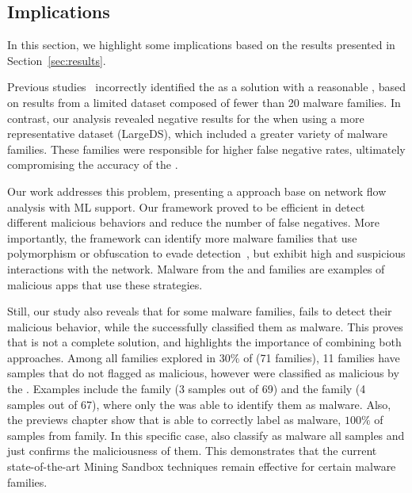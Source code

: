 \subsection{Implications}\label{sec:implications}

In this section, we highlight some implications based on the results presented in Section~\ref{sec:results}.\newline

Previous studies~\cite{DBLP:conf/wcre/BaoLL18,DBLP:conf/iceccs/LeB0GL18,DBLP:journals/jss/CostaMMSSBNR22} incorrectly identified the \mas as a solution with a reasonable \fone, based on results from a limited dataset composed of fewer than 20 malware families. In contrast, our analysis revealed negative results for the \mas when using a more representative dataset (LargeDS), which included a greater variety of malware families. These families were responsible for higher false negative rates, ultimately compromising the accuracy of the \mas.

Our work addresses this problem, presenting a approach base on network flow analysis with ML support. Our framework proved to be efficient in detect different malicious behaviors and reduce the number of false negatives. More importantly, the framework can identify more malware families that use polymorphism or obfuscation to evade detection~\cite{DBLP:conf/acsac/MoserKK07}, but exhibit high and suspicious interactions with the network. Malware from the \gps and \dwg families are examples of malicious apps that use these strategies.

Still, our study also reveals that for some malware families, \droidxpflow fails to detect their malicious behavior, while the \mas successfully classified them as malware. This proves that \net is not a complete solution, and highlights the importance of combining both approaches. Among all families explored in $30\%$ of \fds 
 (71 families), 11 families have samples that \droidxpflow do not flagged as malicious, however were classified as malicious by the \mas. Examples include the  family (3 samples out of 69) and the  family (4 samples out of 67), where only the \mas was able to identify them as malware. Also, the previews chapter show that \mas is able to correctly label as malware, $100\%$ of samples from  family. In this specific case, \droidxpflow also classify as malware all samples and just confirms the maliciousness of them. This demonstrates that the current state-of-the-art Mining Sandbox techniques remain effective for certain malware families.

